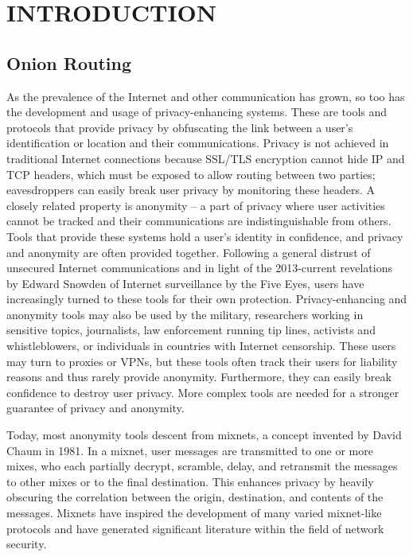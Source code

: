 
\chapter{INTRODUCTION}

\section{Onion Routing}

As the prevalence of the Internet and other communication has grown, so too has the development and usage of privacy-enhancing systems. These are tools and protocols that provide privacy by obfuscating the link between a user's identification or location and their communications. Privacy is not achieved in traditional Internet connections because SSL/TLS encryption cannot hide IP and TCP headers, which must be exposed to allow routing between two parties; eavesdroppers can easily break user privacy by monitoring these headers. A closely related property is anonymity -- a part of privacy where user activities cannot be tracked and their communications are indistinguishable from others. Tools that provide these systems hold a user's identity in confidence, and privacy and anonymity are often provided together. Following a general distrust of unsecured Internet communications and in light of the 2013-current revelations by Edward Snowden of Internet surveillance by the Five Eyes, users have increasingly turned to these tools for their own protection. Privacy-enhancing and anonymity tools may also be used by the military, researchers working in sensitive topics, journalists, law enforcement running tip lines, activists and whistleblowers, or individuals in countries with Internet censorship. These users may turn to proxies or VPNs, but these tools often track their users for liability reasons and thus rarely provide anonymity. Furthermore, they can easily break confidence to destroy user privacy. More complex tools are needed for a stronger guarantee of privacy and anonymity.

Today, most anonymity tools descent from mixnets, a concept invented by David Chaum in 1981.\cite{chaum2003untraceable} In a mixnet, user messages are transmitted to one or more mixes, who each partially decrypt, scramble, delay, and retransmit the messages to other mixes or to the final destination. This enhances privacy by heavily obscuring the correlation between the origin, destination, and contents of the messages. Mixnets have inspired the development of many varied mixnet-like protocols and have generated significant literature within the field of network security.\cite{edman2009anonymity}\cite{syverson2011peel}

